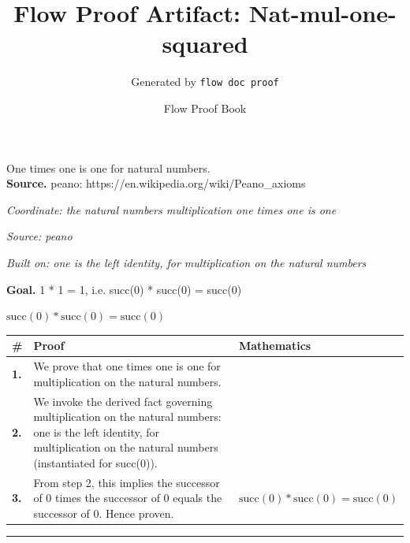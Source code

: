 \documentclass[11pt]{article}
\title{Flow Proof Artifact: Nat-mul-one-squared}
\author{Generated by \texttt{flow doc proof}}
\date{Flow Proof Book}
\theoremstyle{definition}
\begin{document}
\maketitle
One times one is one for natural numbers.\\[0.5em]
\textbf{Source.} peano: https://en.wikipedia.org/wiki/Peano\_axioms\\[0.5em]
\bigskip
{}\par
\smallskip\noindent\textit{Coordinate: the natural numbers \cdot multiplication \cdot one times one is one}\par
\smallskip\noindent\textit{Source: peano}\par
\smallskip\noindent\textit{Built on: one is the left identity, for multiplication on the natural numbers}\par
\medskip
\noindent\textbf{Goal.} 1 * 1 = 1, i.e. succ(0) * succ(0) = succ(0)\par
\noindent$\displaystyle \mathrm{succ}(0) * \mathrm{succ}(0) = \mathrm{succ}(0)$\par
\medskip
\noindent
\begin{tabular}{@{} >{\raggedright\arraybackslash}p{} >{\raggedright\arraybackslash}p{} >{\raggedleft\arraybackslash}p{} @{}}
\textbf{\#} & \textbf{Proof} & \textbf{Mathematics} \\
\midrule
\textbf{1.} & We prove that one times one is one for multiplication on the natural numbers. & \\[0.45em]
\textbf{2.} & We invoke the derived fact governing multiplication on the natural numbers: one is the left identity, for multiplication on the natural numbers (instantiated for succ(0)). & \\[0.45em]
\textbf{3.} & From step 2, this implies the successor of 0 times the successor of 0 equals the successor of 0. Hence proven. & $\displaystyle \mathrm{succ}(0) * \mathrm{succ}(0) = \mathrm{succ}(0)$ \\[0.45em]
\bottomrule
\end{tabular}
\label{thm:Nat-multiplication-one_times_one_is_one}
\par\medskip\hrule
\end{document}
